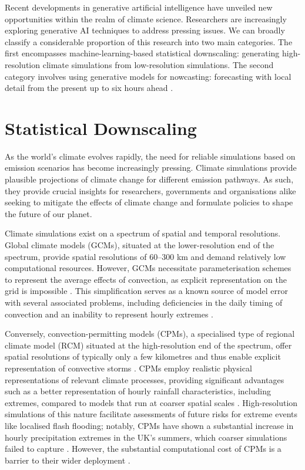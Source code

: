 \documentclass[ oneside,%
                    author={George Herbert},
                    degree={MSci},
                     title={Diffusion Models for Time-Evolving Precipitation Fields},
                  subtitle={}]{dissertation}
\begin{document}
Recent developments in generative artificial intelligence have unveiled new opportunities within the realm of climate science. Researchers are increasingly exploring generative AI techniques to address pressing issues. We can broadly classify a considerable proportion of this research into two main categories. The first encompasses machine-learning-based statistical downscaling: generating high-resolution climate simulations from low-resolution simulations. The second category involves using generative models for nowcasting: forecasting with local detail from the present up to six hours ahead \cite{WMO_Guidelines_Nowcasting}.

\section{Statistical Downscaling}
\label{sec:background_climate_downscaling}

As the world's climate evolves rapidly, the need for reliable simulations based on emission scenarios has become increasingly pressing. Climate simulations provide plausible projections of climate change for different emission pathways. As such, they provide crucial insights for researchers, governments and organisations alike seeking to mitigate the effects of climate change and formulate policies to shape the future of our planet. 

Climate simulations exist on a spectrum of spatial and temporal resolutions. Global climate models (GCMs), situated at the lower-resolution end of the spectrum, provide spatial resolutions of 60--300 km and demand relatively low computational resources. However, GCMs necessitate parameterisation schemes to represent the average effects of convection, as explicit representation on the grid is impossible \cite{MO_CPM}. This simplification serves as a known source of model error with several associated problems, including deficiencies in the daily timing of convection and an inability to represent hourly extremes \cite{Hanel_Hourly_Precipitation_Extremes, Gregersen_Assessing_Future_Climatic_Changes}.

Conversely, convection-permitting models (CPMs), a specialised type of regional climate model (RCM) situated at the high-resolution end of the spectrum, offer spatial resolutions of typically only a few kilometres and thus enable explicit representation of convective storms \cite{MO_CPM}. CPMs employ realistic physical representations of relevant climate processes, providing significant advantages such as a better representation of hourly rainfall characteristics, including extremes, compared to models that run at coarser spatial scales \cite{Kendon_Heavier_Summer_Downpours}. High-resolution simulations of this nature facilitate assessments of future risks for extreme events like localised flash flooding; notably, CPMs have shown a substantial increase in hourly precipitation extremes in the UK's summers, which coarser simulations failed to capture \cite{Kendon_Heavier_Summer_Downpours}. However, the substantial computational cost of CPMs is a barrier to their wider deployment \cite{MO_CPM}.
\end{document}

